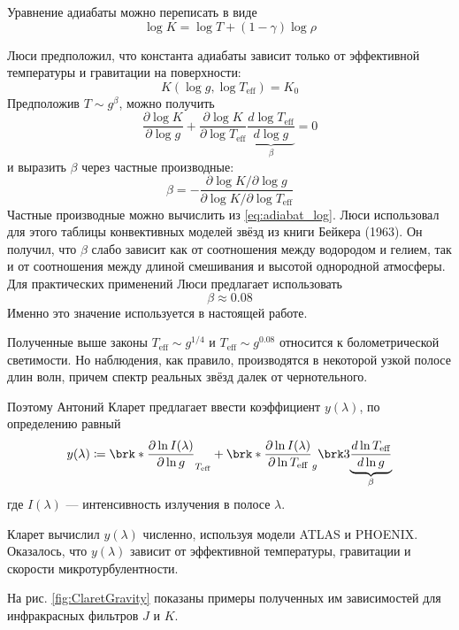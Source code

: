 Уравнение адиабаты можно переписать в виде
\begin{equation}
\log K = \log T + (1 - \gamma) \log \rho
\label{eq:adiabat_log}
\end{equation}

Люси предположил, что константа адиабаты зависит только от эффективной температуры и гравитации на поверхности:
\[
K(\log g, \log T_\text{eff}) = K_0
\]
Предположив $T \sim g^\beta$, можно получить
\[
\frac{\partial \log K}{\partial \log g}
+ \frac{\partial \log K}{\partial \log T_\text{eff}}
\underbrace{\frac{d \log T_\text{eff}}{d \log g}}_{\beta} = 0
\]
и выразить $\beta$ через частные производные:
\[
\beta = -\frac{\partial \log K / \partial \log g}{\partial \log K / \partial \log T_\text{eff}}
\]
Частные производные можно вычислить из \eqref{eq:adiabat_log}. Люси использовал для этого таблицы конвективных моделей звёзд из книги Бейкера (1963). Он получил, что $\beta$ слабо зависит как от соотношения между водородом и гелием, так и от соотношения между длиной смешивания и высотой однородной атмосферы. Для практических применений Люси предлагает использовать
\[
\beta \approx 0.08
\]
Именно это значение используется в настоящей работе.



Полученные выше законы $T_\text{eff} \sim g^{1/4}$ и $T_\text{eff} \sim g^{0.08}$ относится к болометрической светимости.
Но наблюдения, как правило, производятся в некоторой узкой полосе длин волн, причем спектр реальных звёзд далек от чернотельного.

Поэтому Антоний Кларет предлагает \cite{ClaretGravity} ввести коэффициент $y(\lambda)$, по определению равный
\begin{equation}
y(\lambda)
\coloneq \brk*{
    \frac{\partial \ln I(\lambda)}{\partial \ln g}
}_{T_\text{eff}}
+\brk*{
    \frac{\partial \ln I(\lambda)}{\partial \ln T_\text{eff}}
}_g
\brk3{
    \underbrace{
        \frac{d \ln T_\text{eff}}{d \ln g}
    }_{\beta}
}
\label{eq:ClaretGravity}
\end{equation}
где $I(\lambda)$ --- интенсивность излучения в полосе $\lambda$.

Кларет вычислил $y(\lambda)$ численно, используя модели ATLAS и PHOENIX. Оказалось, что $y(\lambda)$ зависит от эффективной температуры, гравитации и скорости микротурбулентности.

На рис. \ref{fig:ClaretGravity} показаны примеры полученных им зависимостей для инфракрасных фильтров $J$ и $K$.

